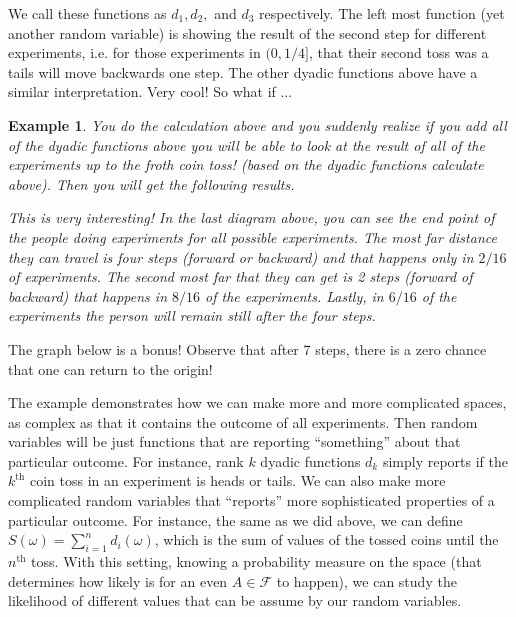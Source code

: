 \documentclass[11pt,a4paper]{article}
\theoremstyle{Example}
\newtheorem{example}{Example}
\begin{document}
 	We call these functions as $ d_1,d_2, $ and $ d_3 $ respectively. The left most function (yet another random variable) is showing the result of the second step for different experiments, i.e. for those experiments in $ (0,1/4] $, that their second toss was a tails will move backwards one step. The other dyadic functions above have a similar interpretation. Very cool! So what if ... 
 	
 	\begin{example}
 		You do the calculation above and you suddenly realize if you add all of the dyadic functions above you will be able to look at the result of all of the experiments up to the froth coin toss! (based on the dyadic functions calculate above). Then you will get the following results.
 		
 		\FloatBarrier
 		\noindent This is very interesting! In the last diagram above, you can see the end point of the people doing experiments for all possible experiments. The most far distance they can travel is four steps (forward or backward) and that happens only in $ 2/16 $ of experiments. The second most far that they can get is 2 steps (forward of backward) that happens in $ 8/16 $ of the experiments. Lastly, in $ 6/16 $ of the experiments the person will remain still after the four steps.
 	\end{example}
 	The graph below is a bonus! Observe that after 7 steps, there is a zero chance that one can return to the origin!
 	
 	\FloatBarrier
 	
 	
 	The example demonstrates how we can make more and more complicated spaces, as complex as that it contains the outcome of all experiments. Then random variables will be just functions that are reporting ``something'' about that particular outcome. For instance, rank $ k $ dyadic functions $ d_k $ simply reports if the $ k^\text{th} $ coin toss in an experiment is heads or tails. We can also make more complicated random variables that ``reports'' more sophisticated properties of a particular outcome. For instance, the same as we did above, we can define $ S(\omega) = \sum_{i=1}^n d_i(\omega) $, which is the sum of values of the tossed coins until the $ n^\text{th} $ toss. With this setting, knowing a probability measure on the space (that determines how likely is for an even $ A \in \mathcal{F} $ to happen), we can study the likelihood of different values that can be assume by our random variables.  
 	
 	
\end{document}
